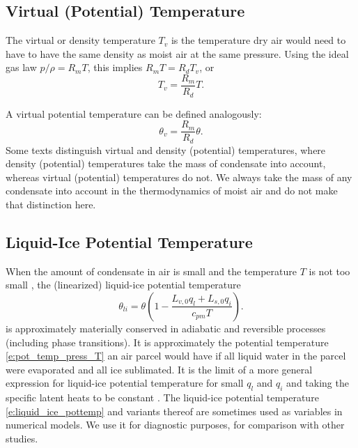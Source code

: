 \documentclass{report}
\begin{document}
\subsection{Virtual (Potential) Temperature} The virtual or density temperature $T_v$ is the temperature dry air would need to have to have the same density as moist air at the same pressure. Using the ideal gas law $p/\rho = R_m T$, this implies $R_m T  = R_d T_v $, or
\begin{equation}\label{e:virtual_temp}
T_v = \frac{R_m}{R_d} T.
\end{equation}

A virtual potential temperature can be defined analogously:
\begin{equation}\label{e:virtual_pottemp}
\theta_v = \frac{R_m}{R_d} \theta.
\end{equation}
Some texts distinguish virtual and density (potential) temperatures, where density (potential) temperatures take the mass of condensate into account, whereas virtual (potential) temperatures do not. We always take the mass of any condensate into account in the thermodynamics of moist air and do not make that distinction here. 

\subsection{Liquid-Ice Potential Temperature}

When the amount of condensate in air is small and the temperature $T$ is not too small \citep[e.g.,][]{Tripoli81}, the (linearized) liquid-ice potential temperature
\begin{equation}\label{e:liquid_ice_pottemp}
\theta_{li} = \theta \left( 1 - \frac{L_{v,0} q_l + L_{s, 0} q_i}{c_{pm} T} \right).
\end{equation}
is approximately materially conserved in adiabatic and reversible processes (including phase transitions). It is approximately the potential temperature \eqref{e:pot_temp_press_T} an air parcel would have if all liquid water in the parcel were evaporated and all ice sublimated. It is the limit of a more general expression for liquid-ice potential temperature for small $q_l$ and $q_i$ and taking the specific latent heats to be constant \citep[e.g.,][]{Bryan04a}. The liquid-ice potential temperature \eqref{e:liquid_ice_pottemp} and variants thereof are sometimes used as variables in numerical models. We use it for diagnostic purposes, for comparison with other studies.
\end{document}
